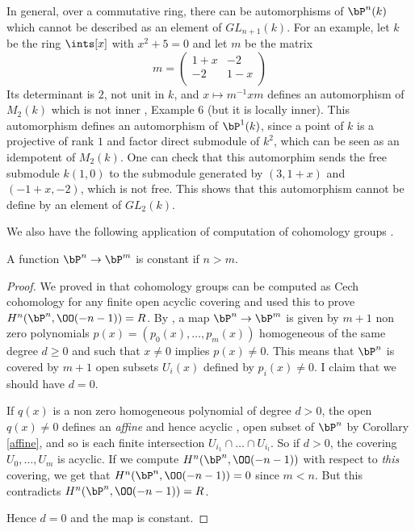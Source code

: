 In general, over a commutative ring,
there can be automorphisms of $\bP^n(k)$ which cannot be described as an element of $GL_{n+1}(k)$.
For an example, let $k$ be the ring $\ints[x]$ with $x^2+5=0$ and let $m$ be the matrix
\[
m =
\begin{pmatrix}
  1+x & -2 \\
  -2 & 1-x \\
\end{pmatrix}  
\]
Its determinant is $2$, not unit in $k$, and $x\mapsto m^{-1}xm$ defines an automorphism of $M_2(k)$
which is not inner \cite{Isaacs}, Example 6 (but it is locally inner). This automorphism defines an
automorphism of $\bP^1(k)$, since a point of $k$ is a projective of rank $1$ and factor direct
submodule of $k^2$, which can be seen as an idempotent of $M_2(k)$. One can check that
this automorphim sends the free submodule $k(1,0)$ to the submodule generated by $(3,1+x)$ and $(-1+x,-2)$,
which is not free. This shows that this automorphism cannot be define by an element of $GL_2(k)$.

\medskip

We also have the following application of computation of cohomology groups \cite{draft}.

\begin{corollary}
A function $\bP^n\rightarrow\bP^m$ is constant if $n>m$.
\end{corollary}

\begin{proof}
We proved in \cite{cech-draft} that cohomology groups can be computed as Cech cohomology for any
finite open acyclic covering and used this to prove $H^n(\bP^n,\OO(-n-1))=R$.
By , a map $\bP^n\rightarrow\bP^m$ is given by $m+1$ non zero polynomials
$p(x) = (p_0(x),\dots,p_m(x))$ homogeneous of the same degree $d\geqslant 0$ and such that $x\neq 0$ implies $p(x)\neq 0$.
This means that $\bP^n$ is covered by $m+1$ open subsets $U_i(x)$ defined by $p_i(x)\neq 0$.
I claim that we should have $d=0$.

 If $q(x)$ is a non zero homogeneous polynomial of degree $d>0$, the open $q(x)\neq 0$ defines an {\em affine}
 and hence acyclic \cite{cech-draft}, open subset of $\bP^n$ by Corollary \ref{affine}, and so is each finite
 intersection $U_{i_1}\cap\dots\cap U_{i_l}$. So if $d>0$, the covering $U_0,\dots,U_m$ is acyclic.
 If we compute $H^n(\bP^n,\OO(-n-1))$ with respect to {\em this} covering, we get that
 $H^n(\bP^n,\OO(-n-1)) = 0$ since $m<n$. But this contradicts $H^n(\bP^n,\OO(-n-1))=R$.

 Hence $d=0$ and the map is constant.
\end{proof}
